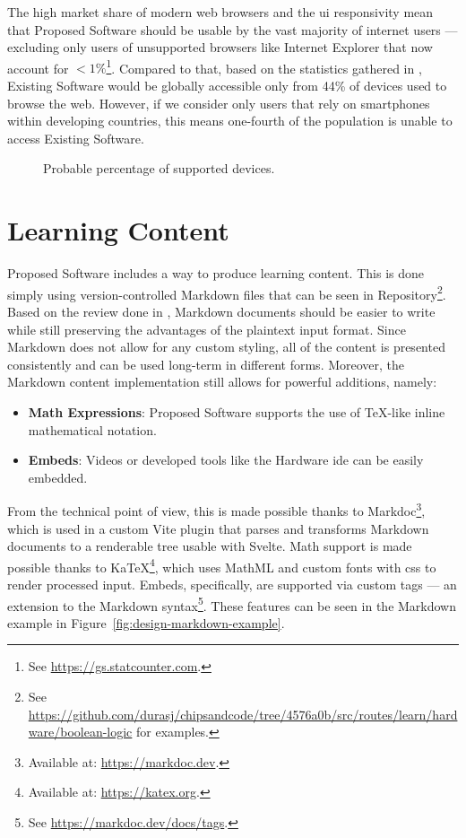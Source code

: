 The high market share of modern web browsers and the \gls{ui} responsivity mean that Proposed Software should be usable by the vast majority of internet users --- excluding only users of unsupported browsers like Internet Explorer that now account for $<1\%$\footnote{See \url{https://gs.statcounter.com}.}.
Compared to that, based on the statistics gathered in , Existing Software would be globally accessible only from 44\% of devices used to browse the web.
However, if we consider only users that rely on smartphones within developing countries, this means one-fourth of the population is unable to access Existing Software.

\begin{figure}[H]
    \centering
    
    \caption{Probable percentage of supported devices.}
    \label{fig:design-device-support}
\end{figure}

\section{Learning Content}

Proposed Software includes a way to produce learning content.
This is done simply using version-controlled Markdown files that can be seen in Repository\footnote{See \url{https://github.com/durasj/chipsandcode/tree/4576a0b/src/routes/learn/hardware/boolean-logic} for examples.}.
Based on the review done in , Markdown documents should be easier to write while still preserving the advantages of the plaintext input format.
Since Markdown does not allow for any custom styling, all of the content is presented consistently and can be used long-term in different forms.
Moreover, the Markdown content implementation still allows for powerful additions, namely:

\begin{itemize}
    \item \textbf{Math Expressions}: Proposed Software supports the use of TeX-like inline mathematical notation.
    \item \textbf{Embeds}: Videos or developed tools like the Hardware \gls{ide} can be easily embedded.
\end{itemize}

From the technical point of view, this is made possible thanks to Markdoc\footnote{Available at: \url{https://markdoc.dev}.}, which is used in a custom Vite plugin that parses and transforms Markdown documents to a renderable tree usable with Svelte.
Math support is made possible thanks to KaTeX\footnote{Available at: \url{https://katex.org}.}, which uses MathML and custom fonts with \gls{css} to render processed input.
Embeds, specifically, are supported via custom tags --- an extension to the Markdown syntax\footnote{See \url{https://markdoc.dev/docs/tags}.}.
These features can be seen in the Markdown example in Figure~\ref{fig:design-markdown-example}.

